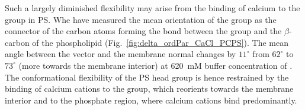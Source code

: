 \documentclass[journal=jpcbfk,manuscript=article]{achemso}
\begin{document}
Such a largely diminished flexibility 
may arise from the binding of calcium to the  group in PS. 
Whe have measured the mean orientation of the  group 
as the connector of the carbon atoms 
forming the bond between the group and the $\beta$-carbon of the phospholipid 
(Fig.~\ref{fig:delta_ordPar_CaCl_PCPS}).
The mean angle between the  vector and the membrane normal
changes by $11^\circ$ from $62^\circ$ to $73^\circ$ (more towards the membrane interior)
 at 620~mM buffer concentration of .
The conformational flexibility of the PS head group is hence restrained 
by the binding of calcium cations to the  group, 
which reorients towards the membrane interior and to the phosphate region, 
where calcium cations bind predominantly. 
\end{document}

